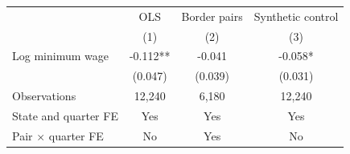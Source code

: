 \begin{tabular}{@{}lccc@{}}
\toprule
 & OLS & Border pairs & Synthetic control \\
 & (1) & (2) & (3) \\
\midrule
Log minimum wage & -0.112** & -0.041 & -0.058* \\
 & (0.047) & (0.039) & (0.031) \\
\midrule
Observations & 12,240 & 6,180 & 12,240 \\
State and quarter FE & Yes & Yes & Yes \\
Pair $\times$ quarter FE & No & Yes & No \\
\bottomrule
\end{tabular}
